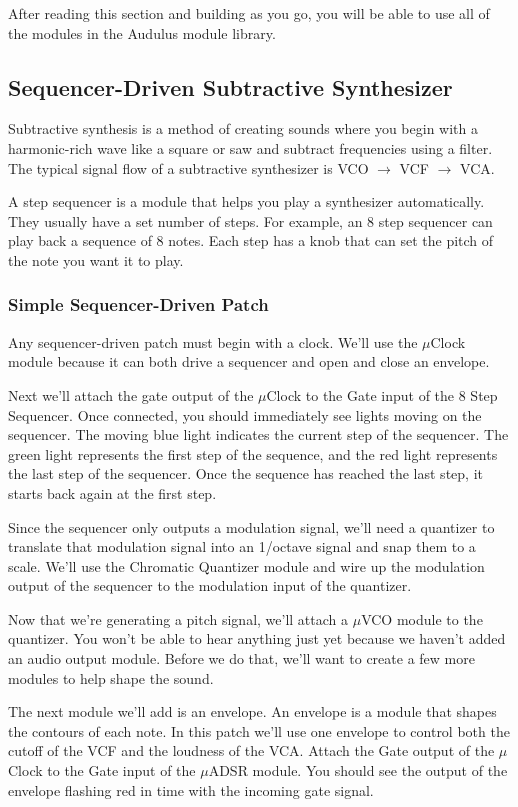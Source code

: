 \documentclass[11pt]{book}
\begin{document}
After reading this section and building as you go, you will be able to use all of the modules in the Audulus module library. 

\subsection{Sequencer-Driven Subtractive Synthesizer}

Subtractive synthesis is a method of creating sounds where you begin with a harmonic-rich wave like a square or saw and subtract frequencies using a filter. The typical signal flow of a subtractive synthesizer is VCO $\rightarrow$ VCF $\rightarrow$ VCA.

A step sequencer is a module that helps you play a synthesizer automatically. They usually have a set number of steps. For example, an 8 step sequencer can play back a sequence of 8 notes. Each step has a knob that can set the pitch of the note you want it to play. 

\subsubsection{Simple Sequencer-Driven Patch}

Any sequencer-driven patch must begin with a clock. We'll use the $\mu$Clock module because it can both drive a sequencer and open and close an envelope.

Next we'll attach the gate output of the $\mu$Clock to the Gate input of the 8 Step Sequencer. Once connected, you should immediately see lights moving on the sequencer. The moving blue light indicates the current step of the sequencer. The green light represents the first step of the sequence, and the red light represents the last step of the sequencer. Once the sequence has reached the last step, it starts back again at the first step.

Since the sequencer only outputs a modulation signal, we'll need a quantizer to translate that modulation signal into an 1/octave signal and snap them to a scale. We'll use the Chromatic Quantizer module and wire up the modulation output of the sequencer to the modulation input of the quantizer.

Now that we're generating a pitch signal, we'll attach a $\mu$VCO module to the quantizer. You won't be able to hear anything just yet because we haven't added an audio output module. Before we do that, we'll want to create a few more modules to help shape the sound.

The next module we'll add is an envelope. An envelope is a module that shapes the contours of each note. In this patch we'll use one envelope to control both the cutoff of the VCF and the loudness of the VCA. Attach the Gate output of the $\mu$Clock to the Gate input of the $\mu$ADSR module. You should see the output of the envelope flashing red in time with the incoming gate signal.
\end{document}
